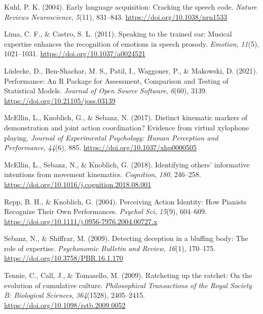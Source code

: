 \documentclass[
  man,floatsintext]{apa6}
\newlength{\cslhangindent}
\newlength{\cslentryspacingunit} %
\newenvironment{CSLReferences}[2] %
 {%
  \setlength{\parindent}{0pt}
  \ifodd #1
  \let\oldpar\par
  \def\par{\hangindent=\cslhangindent\oldpar}
  \fi
  \setlength{\parskip}{#2\cslentryspacingunit}
 }%
 {}
\begin{document}
\begin{CSLReferences}{1}{0}
\leavevmode{}%
Kuhl, P. K. (2004). Early language acquisition: Cracking the speech code. \emph{Nature Reviews Neuroscience}, \emph{5}(11), 831--843. \url{https://doi.org/10.1038/nrn1533}

\leavevmode{}%
Lima, C. F., \& Castro, S. L. (2011). Speaking to the trained ear: Musical expertise enhances the recognition of emotions in speech prosody. \emph{Emotion}, \emph{11}(5), 1021--1031. \url{https://doi.org/10.1037/a0024521}

\leavevmode{}%
Lüdecke, D., Ben-Shachar, M. S., Patil, I., Waggoner, P., \& Makowski, D. (2021). Performance: {An R Package} for {Assessment}, {Comparison} and {Testing} of {Statistical Models}. \emph{Journal of Open Source Software}, \emph{6}(60), 3139. \url{https://doi.org/10.21105/joss.03139}

\leavevmode{}%
McEllin, L., Knoblich, G., \& Sebanz, N. (2017). Distinct kinematic markers of demonstration and joint action coordination? {Evidence} from virtual xylophone playing. \emph{Journal of Experimental Psychology: Human Perception and Performance}, \emph{44}(6), 885. \url{https://doi.org/10.1037/xhp0000505}

\leavevmode{}%
McEllin, L., Sebanz, N., \& Knoblich, G. (2018). Identifying others' informative intentions from movement kinematics. \emph{Cognition}, \emph{180}, 246--258. \url{https://doi.org/10.1016/j.cognition.2018.08.001}

\leavevmode{}%
Repp, B. H., \& Knoblich, G. (2004). Perceiving {Action Identity}: {How Pianists Recognize Their Own Performances}. \emph{Psychol Sci}, \emph{15}(9), 604--609. \url{https://doi.org/10.1111/j.0956-7976.2004.00727.x}

\leavevmode{}%
Sebanz, N., \& Shiffrar, M. (2009). Detecting deception in a bluffing body: {The} role of expertise. \emph{Psychonomic Bulletin and Review}, \emph{16}(1), 170--175. \url{https://doi.org/10.3758/PBR.16.1.170}

\leavevmode{}%
Tennie, C., Call, J., \& Tomasello, M. (2009). Ratcheting up the ratchet: On the evolution of cumulative culture. \emph{Philosophical Transactions of the Royal Society B: Biological Sciences}, \emph{364}(1528), 2405--2415. \url{https://doi.org/10.1098/rstb.2009.0052}


\end{CSLReferences}
\end{document}
